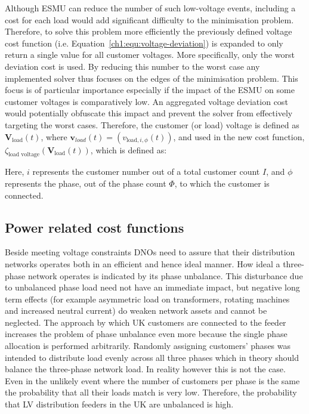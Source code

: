 Although ESMU can reduce the number of such low-voltage events, including a cost for each load would add significant difficulty to the minimisation problem.
Therefore, to solve this problem more efficiently the previously defined voltage cost function (i.e. Equation~\ref{ch1:equ:voltage-deviation}) is expanded to only return a single value for all customer voltages.
More specifically, only the worst deviation cost is used.
By reducing this number to the worst case any implemented solver thus focuses on the edges of the minimisation problem.
This focus is of particular importance especially if the impact of the ESMU on some customer voltages is comparatively low.
An aggregated voltage deviation cost would potentially obfuscate this impact and prevent the solver from effectively targeting the worst cases.
Therefore, the customer (or load) voltage is defined as $\textbf{V}_\text{load}(t)$, where $\textbf{v}_{load}(t) = (v_{\text{load},i,\phi}(t))$, and used in the new cost function, $\zeta_\text{load voltage}(\textbf{V}_\text{load}(t))$, which is defined as:



Here, $i$ represents the customer number out of a total customer count $I$, and $\phi$ represents the phase, out of the phase count $\Phi$, to which the customer is connected.

\subsection{Power related cost functions}
\label{ch1:subsec:powers-related-cost-functions}

Beside meeting voltage constraints DNOs need to assure that their distribution networks operates both in an efficient and hence ideal manner.
How ideal a three-phase network operates is indicated by its phase unbalance.
This disturbance due to unbalanced phase load need not have an immediate impact, but negative long term effects (for example asymmetric load on transformers, rotating machines and increased neutral current) do weaken network assets and cannot be neglected.
The approach by which UK customers are connected to the feeder increases the problem of phase unbalance even more because the single phase allocation is performed arbitrarily.
Randomly assigning customers' phases was intended to distribute load evenly across all three phases which in theory should balance the three-phase network load.
In reality however this is not the case.
Even in the unlikely event where the number of customers per phase is the same the probability that all their loads match is very low.
Therefore, the probability that LV distribution feeders in the UK are unbalanced is high.

